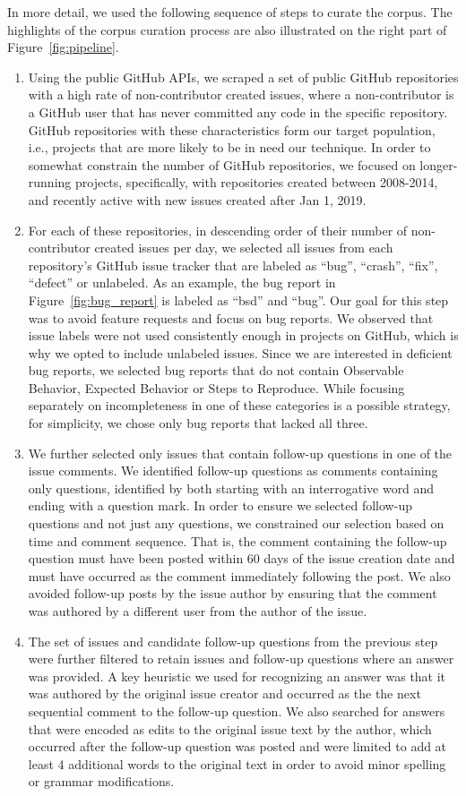 In more detail, we used the following sequence of steps to curate the corpus. The highlights of the corpus curation process are also illustrated on the right part of Figure~\ref{fig:pipeline}.
\begin{enumerate}
\item Using the public GitHub APIs, we scraped a set of public GitHub repositories with a high rate of
non-contributor created issues, where a non-contributor is a GitHub user that has never
committed any code in the specific repository. GitHub repositories with these characteristics form
our target population, i.e., projects that are more likely to be in need our technique. In order
to somewhat constrain the number of GitHub repositories, we focused on longer-running projects,
specifically, with repositories created between 2008-2014, and recently active with new issues created after Jan 1, 2019.
\item For each of these repositories, in descending order of their number of non-contributor created issues per day,
we selected all issues from each repository's GitHub issue tracker that are labeled as ``bug'', ``crash'', ``fix'', ``defect'' or unlabeled. As an example, the bug report in Figure~\ref{fig:bug_report} is labeled as ``bsd'' and ``bug''.
Our goal for this step was to avoid feature requests and focus on bug reports. We observed that issue labels were not used consistently enough
in projects on GitHub, which is why we opted to include unlabeled issues. Since we are interested in deficient bug reports, we selected bug reports that do not contain Observable Behavior, Expected Behavior or Steps to Reproduce. 
While focusing separately on incompleteness in one of these categories is a possible strategy, for simplicity, we chose only bug reports that lacked all three.
\item We further selected only issues that contain follow-up questions in one of the issue comments.  We identified follow-up questions as  comments containing only questions, identified by both starting with an interrogative word and ending with a question mark. In order to ensure we selected follow-up questions and not just
any questions, we constrained our selection based on time and comment sequence. That is, the comment containing the follow-up question must have been posted within 60 days of the issue creation date and must have occurred as the comment immediately following the post. We also avoided follow-up posts by the issue author by ensuring that the comment was authored by a different user from the author of the issue.
\item The set of issues and candidate follow-up questions from the previous step were further filtered to
retain issues and follow-up questions where an answer was provided. A key heuristic we used for recognizing an answer was that it was authored
by the original issue creator and occurred as the the next sequential comment
to the follow-up question. We also searched for answers that were encoded as edits to the original issue text by the author, which occurred after the follow-up question was posted and were limited to add at least 4 additional words to the original text in order to avoid minor spelling or grammar modifications.
\end{enumerate}


